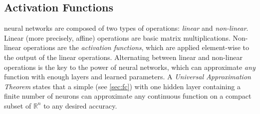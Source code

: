 \subsection{Activation Functions}
\label{sec:activations}
\dl neural networks are composed of two types of operations: \emph{linear} and \emph{non-linear}.
Linear (more precisely, affine) operations are basic matrix multiplications.
Non-linear operations are the \emph{activation functions}, which are applied element-wise to the output of the linear operations.
Alternating between linear and non-linear operations is the key to the power of \dl neural networks, which can approximate \emph{any} function with enough layers and learned parameters.
A \emph{Universal Approximation Theorem} \cite{universal_app_thm} states that a simple \fc (see \cref{sec:fc}) with one hidden layer containing a finite number of neurons can approximate any continuous function on a compact subset of $\mathbb{R}^n$ to any desired accuracy.

